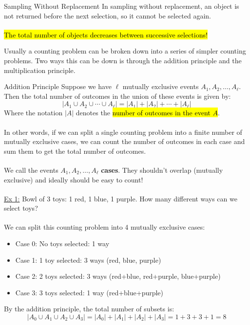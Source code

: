 ﻿\documentclass[12pt]{article}
\begin{document}
\begin{definition}{Sampling Without Replacement}
    In sampling without replacement, an object is not returned before the next selection, so it cannot be selected again.\\\\
    \hl{The total number of objects decreases between successive selections!}
\end{definition}
Usually a counting problem can be broken down into a series of simpler counting problems. Two ways this can be down is through the addition principle and the multiplication principle.
\begin{theorem}{Addition Principle}
Suppose we have $\ell$ mutually exclusive events $A_1, A_2, \ldots, A_\ell$. Then the total number of outcomes in the union of these events is given by:
\[|A_1 \cup A_2 \cup \cdots \cup A_\ell| = |A_1| + |A_2| + \cdots + |A_\ell|\]
Where the notation $|A|$ denotes the \hl{number of outcomes in the event $A$}.\\\\
In other words, if we can split a single counting problem into a finite number of mutually exclusive cases, we can count the number of outcomes in each case and sum them to get the total number of outcomes.\\\\
We call the events $A_1, A_2, \ldots, A_\ell$ \textbf{cases}. They shouldn't overlap (mutually exclusive) and ideally should be easy to count!\\\\
\underline{Ex 1:} Bowl of 3 toys: 1 red, 1 blue, 1 purple. How many different ways can we select toys?\\\\
We can split this counting problem into 4 mutually exclusive cases:
\begin{itemize}
    \item Case 0: No toys selected: 1 way
    \item Case 1: 1 toy selected: 3 ways (red, blue, purple)
    \item Case 2: 2 toys selected: 3 ways (red+blue, red+purple, blue+purple)
    \item Case 3: 3 toys selected: 1 way (red+blue+purple)
\end{itemize}
By the addition principle, the total number of subsets is:
\[|A_0 \cup A_1 \cup A_2 \cup A_3| = |A_0| + |A_1| + |A_2| + |A_3| = 1 + 3 + 3 + 1 = 8\] 
\end{theorem}
\end{document}

